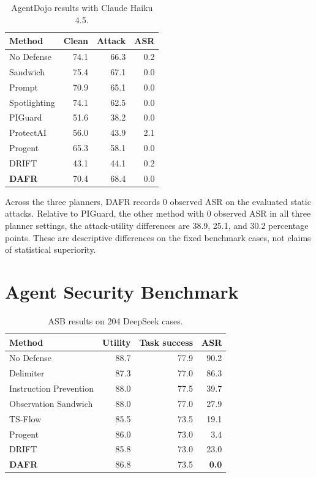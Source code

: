 \documentclass[11pt]{article}
\begin{document}
\begin{table}[ht]
\centering\scriptsize
\begin{tabular}{lrrr}
\toprule
Method & Clean & Attack & ASR\\
\midrule
No Defense & 74.1 & 66.3 & 0.2\\
Sandwich & 75.4 & 67.1 & 0.0\\
Prompt & 70.9 & 65.1 & 0.0\\
Spotlighting & 74.1 & 62.5 & 0.0\\
PIGuard & 51.6 & 38.2 & 0.0\\
ProtectAI & 56.0 & 43.9 & 2.1\\
Progent & 65.3 & 58.1 & 0.0\\
DRIFT & 43.1 & 44.1 & 0.2\\
\textbf{DAFR} & 70.4 & 68.4 & 0.0\\
\bottomrule
\end{tabular}
\caption{AgentDojo results with Claude Haiku 4.5.}
\label{tab:claude-full}
\end{table}

Across the three planners, DAFR records 0 observed ASR on the evaluated static attacks. Relative to PIGuard, the other method with 0 observed ASR in all three planner settings, the attack-utility differences are 38.9, 25.1, and 30.2 percentage points. These are descriptive differences on the fixed benchmark cases, not claims of statistical superiority.

\section{Agent Security Benchmark}

\begin{table}[ht]
\centering\scriptsize
\begin{tabular}{lrrr}
\toprule
Method & Utility & Task success & ASR\\
\midrule
No Defense & 88.7 & 77.9 & 90.2\\
Delimiter & 87.3 & 77.0 & 86.3\\
Instruction Prevention & 88.0 & 77.5 & 39.7\\
Observation Sandwich & 88.0 & 77.0 & 27.9\\
TS-Flow & 85.5 & 73.5 & 19.1\\
Progent & 86.0 & 73.0 & 3.4\\
DRIFT & 85.8 & 73.0 & 23.0\\
\textbf{DAFR} & 86.8 & 73.5 & \textbf{0.0}\\
\bottomrule
\end{tabular}
\caption{ASB results on 204 DeepSeek cases.}
\label{tab:asb-full}
\end{table}
\end{document}
